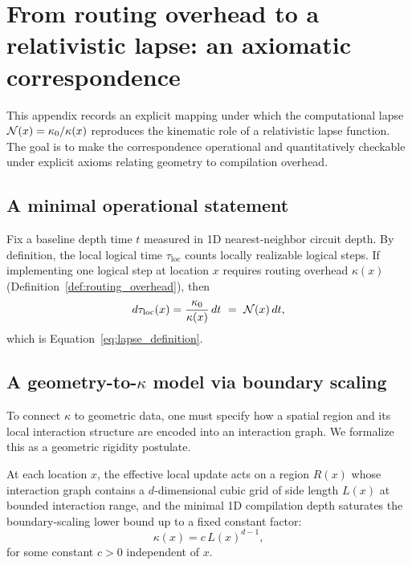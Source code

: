 \section{From routing overhead to a relativistic lapse: an axiomatic correspondence}
\label{app:lapse_correspondence}

This appendix records an explicit mapping under which the computational lapse
$\mathcal{N}(x)=\kappa_0/\kappa(x)$ reproduces the kinematic role of a relativistic lapse function.
The goal is to make the correspondence operational and quantitatively checkable under explicit axioms relating geometry to compilation overhead.

\subsection{A minimal operational statement}
Fix a baseline depth time $t$ measured in 1D nearest-neighbor circuit depth.
By definition, the local logical time $\tau_{\mathrm{loc}}$ counts locally realizable logical steps.
If implementing one logical step at location $x$ requires routing overhead $\kappa(x)$ (Definition~\ref{def:routing_overhead}), then
\begin{equation}
d\tau_{\mathrm{loc}}(x)=\frac{\kappa_0}{\kappa(x)}\,dt\ =\ \lapse(x)\,dt,
\end{equation}
which is Equation~\eqref{eq:lapse_definition}.

\subsection{A geometry-to-\texorpdfstring{$\kappa$}{kappa} model via boundary scaling}
To connect $\kappa$ to geometric data, one must specify how a spatial region and its local interaction structure are encoded into an interaction graph.
We formalize this as a geometric rigidity postulate.

\begin{axiom}
\label{ax:geometric_rigidity_overhead}
At each location $x$, the effective local update acts on a region $R(x)$ whose interaction graph contains a $d$-dimensional cubic grid of side length $L(x)$ at bounded interaction range, and the minimal 1D compilation depth saturates the boundary-scaling lower bound up to a fixed constant factor:
\begin{equation}
\kappa(x)=c\,L(x)^{d-1},
\end{equation}
for some constant $c>0$ independent of $x$.
\end{axiom}

